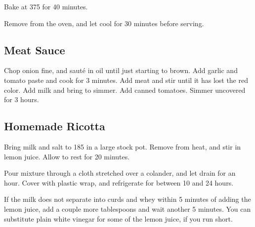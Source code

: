 \begin{recipe}
Bake at 375\degree{} for 40 minutes.

Remove from the oven, and let cool for 30 minutes before serving.

\newpage

\subsection{Meat Sauce}



Chop onion fine, and sauté in oil until just starting to brown. Add garlic and tomato paste and cook for 3 minutes.
Add meat and stir until it has lost the red color. Add milk and bring to simmer. Add canned tomatoes.
Simmer uncovered for 3 hours.

\subsection{Homemade Ricotta}


Bring milk and salt to 185\degree{} in a large stock pot. Remove from heat, and stir in lemon juice. Allow to rest for 20 minutes.

Pour mixture through a cloth stretched over a colander, and let drain for an hour. Cover with plastic wrap, and refrigerate for between 10 and 24 hours.

If the milk does not separate into curds and whey within 5 minutes of adding the lemon juice, add a couple more tablespoons and wait another 5 minutes. You can substitute plain white vinegar for some of the lemon juice, if you run short.

\end{recipe}
